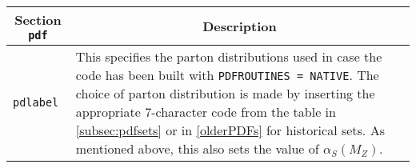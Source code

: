 	\begin{longtable}{p{1.5cm}p{12cm}}
		\toprule
		\multicolumn{1}{c}{{\textbf{Section} \texttt{pdf}}} & \multicolumn{1}{c}{{\textbf{Description}}} \\ 
		\midrule
		\texttt{pdlabel} &
		This specifies the parton distributions used in case the code has been built with
		\texttt{PDFROUTINES = NATIVE}. The choice of parton distribution is made by
		inserting the appropriate 7-character code from the table in \cref{subsec:pdfsets}
		or in \cref{olderPDFs} for historical \PDF{} sets.
		As mentioned above, this also sets the value of $\alpha_S(M_Z)$.\\
		\bottomrule
	\end{longtable}
